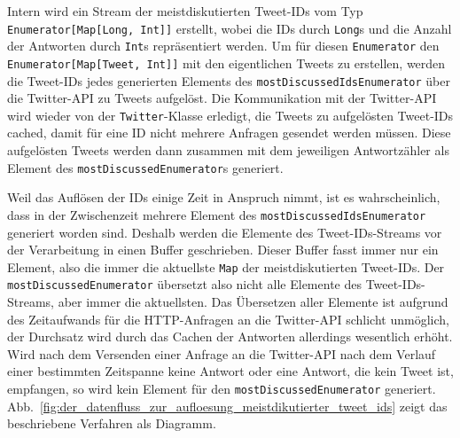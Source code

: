Intern wird ein Stream der meistdiskutierten Tweet-IDs vom Typ \lstinline|Enumerator[Map[Long, Int]]| erstellt, wobei die IDs durch \lstinline|Long|s und die Anzahl der Antworten durch \lstinline|Int|s repräsentiert werden.
Um für diesen \lstinline|Enumerator| den \lstinline|Enumerator[Map[Tweet, Int]]| mit den eigentlichen Tweets zu erstellen, werden die Tweet-IDs jedes generierten Elements des \lstinline|mostDiscussedIdsEnumerator| über die Twitter-API zu Tweets aufgelöst.
Die Kommunikation mit der Twitter-API wird wieder von der \lstinline|Twitter|-Klasse erledigt, die Tweets zu aufgelösten Tweet-IDs cached, damit für eine ID nicht mehrere Anfragen gesendet werden müssen.
Diese aufgelösten Tweets werden dann zusammen mit dem jeweiligen Antwortzähler als Element des \lstinline|mostDiscussedEnumerator|s generiert.

Weil das Auflösen der IDs einige Zeit in Anspruch nimmt, ist es wahrscheinlich, dass in der Zwischenzeit mehrere Element des \lstinline|mostDiscussedIdsEnumerator| generiert worden sind.
Deshalb werden die Elemente des Tweet-IDs-Streams vor der Verarbeitung in einen Buffer geschrieben.
Dieser Buffer fasst immer nur ein Element, also die immer die aktuellste \lstinline|Map| der meistdiskutierten Tweet-IDs.
Der \lstinline|mostDiscussedEnumerator| übersetzt also nicht alle Elemente des Tweet-IDs-Streams, aber immer die aktuellsten.
Das Übersetzen aller Elemente ist aufgrund des Zeitaufwands für die HTTP-Anfragen an die Twitter-API schlicht unmöglich, der Durchsatz wird durch das Cachen der Antworten allerdings wesentlich erhöht.
Wird nach dem Versenden einer Anfrage an die Twitter-API nach dem Verlauf einer bestimmten Zeitspanne keine Antwort oder eine Antwort, die kein Tweet ist, empfangen, so wird kein Element für den \lstinline|mostDiscussedEnumerator| generiert.
Abb.~\ref{fig:der_datenfluss_zur_aufloesung_meistdikutierter_tweet_ids} zeigt das beschriebene Verfahren als Diagramm.


